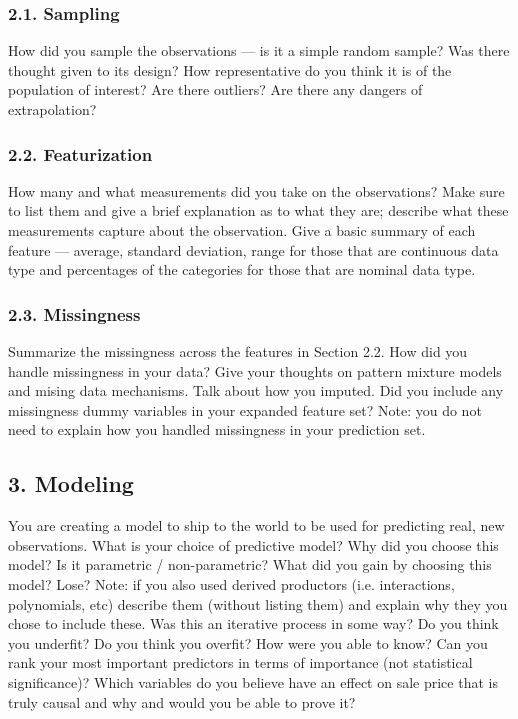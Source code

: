 \documentclass[12pt]{article}
\begin{document}
\begin{tcolorbox}
\subsubsection*{2.1. Sampling}

How did you sample the observations --- is it a simple random sample? Was there thought given to its design? How representative do you think it is of the population of interest? Are there outliers? Are there any dangers of extrapolation?


\subsubsection*{2.2. Featurization}

How many and what measurements did you take on the observations? Make sure to list them and give a brief explanation as to what they are; describe what these measurements capture about the observation. Give a basic summary of each feature --- average, standard deviation, range for those that are continuous data type and percentages of the categories for those that are nominal data type.


\subsubsection*{2.3. Missingness}

Summarize the missingness across the features in Section 2.2. How did you handle missingness in your data? Give your thoughts on pattern mixture models and mising data mechanisms. Talk about how you imputed. Did you include any missingness dummy variables in your expanded feature set? Note: you do not need to explain how you handled missingness in your prediction set.


\subsection*{3. Modeling}

You are creating a model to ship to the world to be used for predicting real, new observations. What is your choice of predictive model? Why did you choose this model? Is it parametric / non-parametric? What did you gain by choosing this model? Lose? Note: if you also used derived productors (i.e. interactions, polynomials, etc) describe them (without listing them) and explain why they you chose to include these. Was this an iterative process in some way? Do you think you underfit? Do you think you overfit? How were you able to know? Can you rank your most important predictors in terms of importance (not statistical significance)? Which variables do you believe have an effect on sale price that is truly causal and why and would you be able to prove it?


\end{tcolorbox}
\end{document}
